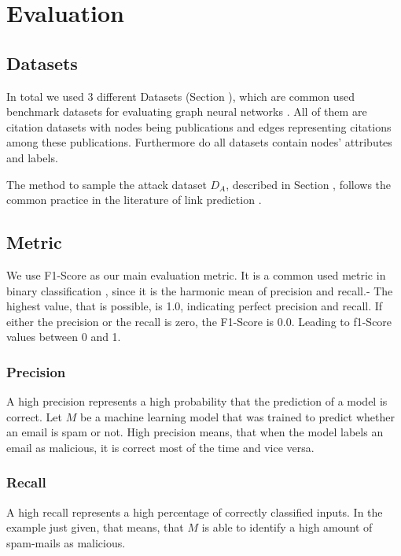 \chapter{Evaluation}

    \section{Datasets}
        In total we used 3 different Datasets (Section ), which are common used benchmark datasets for evaluating graph neural networks \cite{acharya2019feature, gao2019graphnas, gcn}.
        All of them are citation datasets with nodes being publications and edges representing citations among these publications.        
        Furthermore do all datasets contain nodes' attributes and labels.

        The method to sample the attack dataset $D_A$, described in Section , follows the common practice in the literature of link prediction \cite{BHPZ17, grover2016node2vec}.

    \section{Metric}
        We use F1-Score as our main evaluation metric.
        It is a common used metric in binary classification \cite{lipton2014thresholding, santus2016features, woodbridge2016predicting}, since it is the harmonic mean of precision and recall.-
        The highest value, that is possible, is 1.0, indicating perfect precision and recall.
        If either the precision or the recall is zero, the F1-Score is 0.0.
        Leading to f1-Score values between 0 and 1.

        \subsection*{Precision}
            A high precision represents a high probability that the prediction of a model is correct.
            Let $M$ be a machine learning model that was trained to predict whether an email is spam or not.
            High precision means, that when the model labels an email as malicious, it is correct most of the time and vice versa.

        \subsection*{Recall}
            A high recall represents a high percentage of correctly classified inputs.
            In the example just given, that means, that $M$ is able to identify a high amount of spam-mails as malicious.


